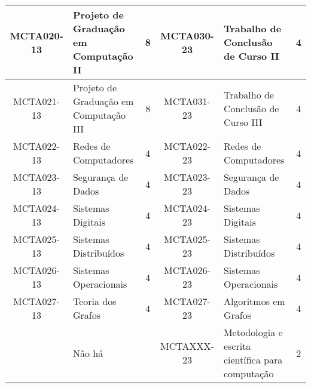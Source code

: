 \begin{table}[h!]
{\begin{tabular}{|c|p{}|c||c|p{}|c|}
			MCTA020-13 & Projeto de Graduação em Computação II & 8 & MCTA030-23 & Trabalho de Conclusão de Curso II & 4 \\ \hline
			MCTA021-13 & Projeto de Graduação em Computação III & 8 & MCTA031-23 & Trabalho de Conclusão de Curso III & 4 \\ \hline
			MCTA022-13 & Redes de Computadores & 4 & MCTA022-23 & Redes de Computadores & 4 \\ \hline
			MCTA023-13 & Segurança de Dados & 4 & MCTA023-23 & Segurança de Dados & 4 \\ \hline
			MCTA024-13 & Sistemas Digitais & 4 & MCTA024-23 & Sistemas Digitais & 4 \\ \hline
			MCTA025-13 & Sistemas Distribuídos & 4 & MCTA025-23 & Sistemas Distribuídos & 4 \\ \hline
			MCTA026-13 & Sistemas Operacionais & 4 & MCTA026-23 & Sistemas Operacionais & 4 \\ \hline
			MCTA027-13 & Teoria dos Grafos & 4 & MCTA027-23 & Algoritmos em Grafos & 4 \\ \hline
			& Não há & & MCTAXXX-23 & Metodologia e escrita científica para computação & 2 \\ \hline
		\end{tabular}
	}
\end{table}

